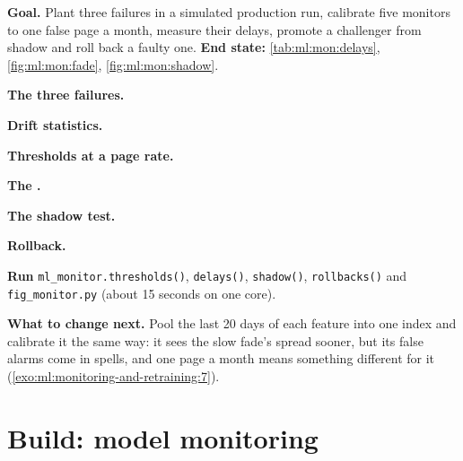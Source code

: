 \begin{tutorial}
\textbf{Goal.} Plant three failures in a simulated production run, calibrate five monitors to one false page a month, measure
their delays, promote a challenger from shadow and roll back a faulty one. \textbf{End state:} \cref{tab:ml:mon:delays},
\cref{fig:ml:mon:fade}, \cref{fig:ml:mon:shadow}.
\begin{tutsteps}
\item \textbf{The three failures.}
\label{lst:ml:mon:day}
\item \textbf{Drift statistics.}
\label{lst:ml:mon:psi}
\item \textbf{Thresholds at a page rate.}
\label{lst:ml:mon:calib}
\item \textbf{The .}
\label{lst:ml:mon:cusum}
\item \textbf{The shadow test.}
\label{lst:ml:mon:shadow}
\item \textbf{Rollback.}
\label{lst:ml:mon:rollback}
\item \textbf{Run} \texttt{ml\_monitor.thresholds()}, \texttt{delays()}, \texttt{shadow()}, \texttt{rollbacks()} and
\texttt{fig\_monitor.py} (about 15 seconds on one core).
\end{tutsteps}
\textbf{What to change next.} Pool the last 20 days of each feature into one index and calibrate it the same way: it sees the
slow fade's spread sooner, but its false alarms come in spells, and one page a month means something different for it
(\cref{exo:ml:monitoring-and-retraining:7}).
\end{tutorial}

\section{Build: model monitoring}\label{bld:ml:monitoring-and-retraining:mlmonitor}

